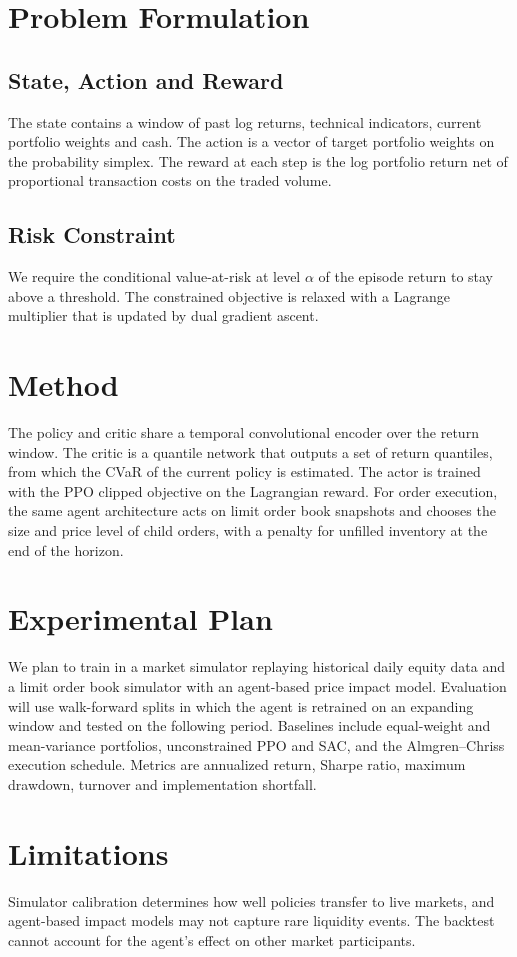 \documentclass{article}
\begin{document}
\section{Problem Formulation}
\subsection{State, Action and Reward}
The state contains a window of past log returns, technical indicators, current
portfolio weights and cash. The action is a vector of target portfolio weights
on the probability simplex. The reward at each step is the log portfolio
return net of proportional transaction costs on the traded volume.

\subsection{Risk Constraint}
We require the conditional value-at-risk at level $\alpha$ of the episode
return to stay above a threshold. The constrained objective is relaxed with a
Lagrange multiplier that is updated by dual gradient ascent.

\section{Method}
The policy and critic share a temporal convolutional encoder over the return
window. The critic is a quantile network that outputs a set of return
quantiles, from which the CVaR of the current policy is estimated. The actor is
trained with the PPO clipped objective on the Lagrangian reward. For order
execution, the same agent architecture acts on limit order book snapshots and
chooses the size and price level of child orders, with a penalty for unfilled
inventory at the end of the horizon.

\section{Experimental Plan}
We plan to train in a market simulator replaying historical daily equity data
and a limit order book simulator with an agent-based price impact model.
Evaluation will use walk-forward splits in which the agent is retrained on an
expanding window and tested on the following period. Baselines include
equal-weight and mean-variance portfolios, unconstrained PPO and SAC, and the
Almgren--Chriss execution schedule. Metrics are annualized return, Sharpe
ratio, maximum drawdown, turnover and implementation shortfall.

\section{Limitations}
Simulator calibration determines how well policies transfer to live markets,
and agent-based impact models may not capture rare liquidity events. The
backtest cannot account for the agent's effect on other market participants.
\end{document}
